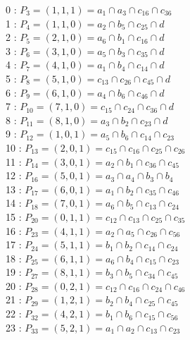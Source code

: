 \documentclass{article}
\begin{document}
{0 : $P_{3}=( 1, 1, 1 ) = a_{1} \cap a_{3} \cap c_{16} \cap c_{36}$\\
1 : $P_{4}=( 1, 1, 0 ) = a_{2} \cap b_{5} \cap c_{25} \cap d$\\
2 : $P_{5}=( 2, 1, 0 ) = a_{6} \cap b_{1} \cap c_{16} \cap d$\\
3 : $P_{6}=( 3, 1, 0 ) = a_{5} \cap b_{3} \cap c_{35} \cap d$\\
4 : $P_{7}=( 4, 1, 0 ) = a_{1} \cap b_{4} \cap c_{14} \cap d$\\
5 : $P_{8}=( 5, 1, 0 ) = c_{13} \cap c_{26} \cap c_{45} \cap d$\\
6 : $P_{9}=( 6, 1, 0 ) = a_{4} \cap b_{6} \cap c_{46} \cap d$\\
7 : $P_{10}=( 7, 1, 0 ) = c_{15} \cap c_{24} \cap c_{36} \cap d$\\
8 : $P_{11}=( 8, 1, 0 ) = a_{3} \cap b_{2} \cap c_{23} \cap d$\\
9 : $P_{12}=( 1, 0, 1 ) = a_{5} \cap b_{6} \cap c_{14} \cap c_{23}$\\
10 : $P_{13}=( 2, 0, 1 ) = c_{15} \cap c_{16} \cap c_{25} \cap c_{26}$\\
11 : $P_{14}=( 3, 0, 1 ) = a_{2} \cap b_{1} \cap c_{36} \cap c_{45}$\\
12 : $P_{16}=( 5, 0, 1 ) = a_{3} \cap a_{4} \cap b_{3} \cap b_{4}$\\
13 : $P_{17}=( 6, 0, 1 ) = a_{1} \cap b_{2} \cap c_{35} \cap c_{46}$\\
14 : $P_{18}=( 7, 0, 1 ) = a_{6} \cap b_{5} \cap c_{13} \cap c_{24}$\\
15 : $P_{20}=( 0, 1, 1 ) = c_{12} \cap c_{13} \cap c_{25} \cap c_{35}$\\
16 : $P_{23}=( 4, 1, 1 ) = a_{2} \cap a_{5} \cap c_{26} \cap c_{56}$\\
17 : $P_{24}=( 5, 1, 1 ) = b_{1} \cap b_{2} \cap c_{14} \cap c_{24}$\\
18 : $P_{25}=( 6, 1, 1 ) = a_{6} \cap b_{4} \cap c_{15} \cap c_{23}$\\
19 : $P_{27}=( 8, 1, 1 ) = b_{3} \cap b_{5} \cap c_{34} \cap c_{45}$\\
20 : $P_{28}=( 0, 2, 1 ) = c_{12} \cap c_{16} \cap c_{24} \cap c_{46}$\\
21 : $P_{29}=( 1, 2, 1 ) = b_{2} \cap b_{4} \cap c_{25} \cap c_{45}$\\
22 : $P_{32}=( 4, 2, 1 ) = b_{1} \cap b_{6} \cap c_{15} \cap c_{56}$\\
23 : $P_{33}=( 5, 2, 1 ) = a_{1} \cap a_{2} \cap c_{13} \cap c_{23}$\\
}
\end{document}
